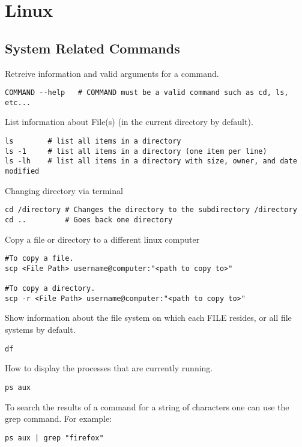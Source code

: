 \chapter{Linux}
\thispagestyle{fancy}
\lstset{language=Bash, style=bash}

\section{System Related Commands}

Retreive information and valid arguments for a command.
\begin{lstlisting}
COMMAND --help   # COMMAND must be a valid command such as cd, ls, etc...
\end{lstlisting}

List information about File(s) (in the current directory by default).
\begin{lstlisting}
ls        # list all items in a directory
ls -1     # list all items in a directory (one item per line)
ls -lh    # list all items in a directory with size, owner, and date modified
\end{lstlisting}

Changing directory via terminal
\begin{lstlisting}
cd /directory # Changes the directory to the subdirectory /directory
cd ..         # Goes back one directory
\end{lstlisting}

Copy a file or directory to a different linux computer
\begin{lstlisting}
#To copy a file.
scp <File Path> username@computer:"<path to copy to>"

#To copy a directory.
scp -r <File Path> username@computer:"<path to copy to>"
\end{lstlisting}

Show information about the file system on which each FILE resides, or all file systems by default.
\begin{lstlisting}
df 
\end{lstlisting}

How to display the processes that are currently running.
\begin{lstlisting}
ps aux
\end{lstlisting}

To search the results of a command for a string of characters one can use the grep command. For example:
\begin{lstlisting}
ps aux | grep "firefox"
\end{lstlisting}

